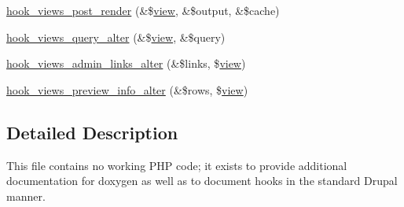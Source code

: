 \begin{CompactItemize}
\item 
\hyperlink{group__views__hooks_g21cc61642e5cafc23ec621f07dae1f4b}{hook\_\-views\_\-post\_\-render} (\&\$\hyperlink{classview}{view}, \&\$output, \&\$cache)
\item 
\hyperlink{group__views__hooks_gf4d538493930fe0fa0ce6fb3bf42c156}{hook\_\-views\_\-query\_\-alter} (\&\$\hyperlink{classview}{view}, \&\$query)
\item 
\hyperlink{group__views__hooks_ge8633ca67e214bf3e676eb032c06b395}{hook\_\-views\_\-admin\_\-links\_\-alter} (\&\$links, \$\hyperlink{classview}{view})
\item 
\hyperlink{group__views__hooks_gfeafa28dd3e140b2d4f8cfdfc7d76922}{hook\_\-views\_\-preview\_\-info\_\-alter} (\&\$rows, \$\hyperlink{classview}{view})
\end{CompactItemize}


\subsection{Detailed Description}
This file contains no working PHP code; it exists to provide additional documentation for doxygen as well as to document hooks in the standard Drupal manner. 